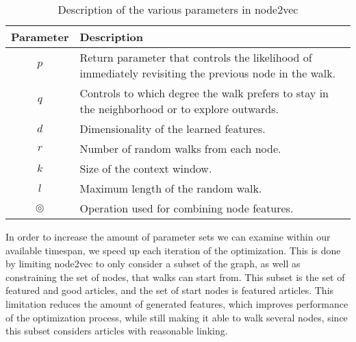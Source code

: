 
\begin{table}[tbp]
\centering
\begin{tabular}{@{}cp{}@{}}
\toprule
\textbf{Parameter} & \textbf{Description} \\
\midrule
$p$          &   Return parameter that controls the likelihood of immediately revisiting the previous node in the walk.   \\
$q$          &   Controls to which degree the walk prefers to stay in the neighborhood or to explore outwards.   \\
$d$          &   Dimensionality of the learned features.   \\
$r$          &   Number of random walks from each node.   \\
$k$          &   Size of the context window.   \\
$l$          &   Maximum length of the random walk.   \\
$\circledcirc$ & Operation used for combining node features.   \\
\bottomrule
\end{tabular}
\caption[Description of parameters in node2vec]{Description of the various parameters in node2vec}%
\label{tab:node2vecparams}
\end{table}


In order to increase the amount of parameter sets we can examine within our available timespan, we speed up each iteration of the optimization. This is done by limiting node2vec to only consider a subset of the graph, as well as constraining the set of nodes, that walks can start from. This subset is the set of featured and good articles, and the set of start nodes is featured articles. This limitation reduces the amount of generated features, which improves performance of the optimization process, while still making it able to walk several nodes, since this subset considers articles with reasonable linking.

